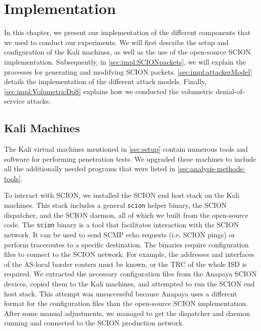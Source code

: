 \chapter{Implementation}
\label{ch:implementation}


In this chapter, we present our implementation of the different components that we used to conduct our experiments.
We will first describe the setup and configuration of the Kali machines, as well as the use of the open-source SCION implementation.
Subsequently, in \cref{sec:impl:SCIONpackets}, we will explain the processes for generating and modifying SCION packets.
\cref{sec:impl:attackerModel} details the implementation of the different attack models.
Finally, \cref{sec:impl:VolumetricDoS} explains how we conducted the volumetric denial-of-service attacks.

\section{Kali Machines}

The Kali virtual machines mentioned in \cref{sec:setup} contain numerous tools and software for performing penetration tests.
We upgraded these machines to include all the additionally needed programs that were listed in \cref{sec:analysis-methods-tools}.

To interact with SCION, we installed the SCION end host stack on the Kali machines.
This stack includes a general \texttt{scion} helper binary, the SCION dispatcher, and the SCION daemon, all of which we built from the open-source code.
The \texttt{scion} binary is a tool that facilitates interaction with the SCION network.
It can be used to send SCMP echo requests (i.e, SCION pings) or perform traceroutes to a specific destination.
The binaries require configuration files to connect to the SCION network.
For example, the addresses and interfaces of the AS-local border routers must be known, or the TRC of the whole ISD is required.
We extracted the necessary configuration files from the Anapaya SCION devices, copied them to the Kali machines, and attempted to run the SCION end host stack.
This attempt was unsuccessful because Anapaya uses a different format for the configuration files than the open-source SCION implementation.
After some manual adjustments, we managed to get the dispatcher and daemon running and connected to the SCION production network.

